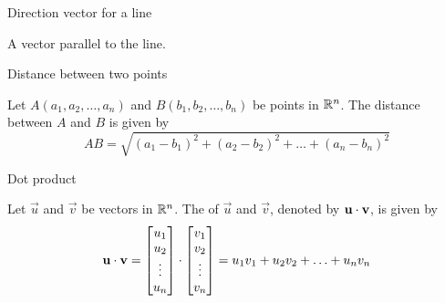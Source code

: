 \documentclass{ximera}
\begin{document}
 
Direction vector for a line

\begin{expandable}
    A vector parallel to the line.
\end{expandable}


Distance between two points 

\begin{expandable}
Let $A(a_1, a_2,\ldots ,a_n)$ and $B(b_1, b_2,\ldots ,b_n)$ be points in $\mathbb{R}^n$.  The distance between $A$ and $B$ is given by
$$AB=\sqrt{(a_1-b_1)^2+(a_2-b_2)^2+\ldots +(a_n-b_n)^2}$$
\end{expandable}


Dot product

\begin{expandable}
  Let $\vec{u}$ and $\vec{v}$ be vectors in $\mathbb{R}^n$.  The  of $\vec{u}$ and $\vec{v}$, denoted by
  $\mathbf{u}\cdot \mathbf{v}$, is given by
$$\mathbf{u}\cdot\mathbf{v}=\begin{bmatrix}u_1\\u_2\\\vdots\\u_n\end{bmatrix}\cdot\begin{bmatrix}v_1\\v_2\\\vdots\\v_n\end{bmatrix}=u_1v_1+u_2v_2+\ldots+u_nv_n$$
\end{expandable}

\end{document}
